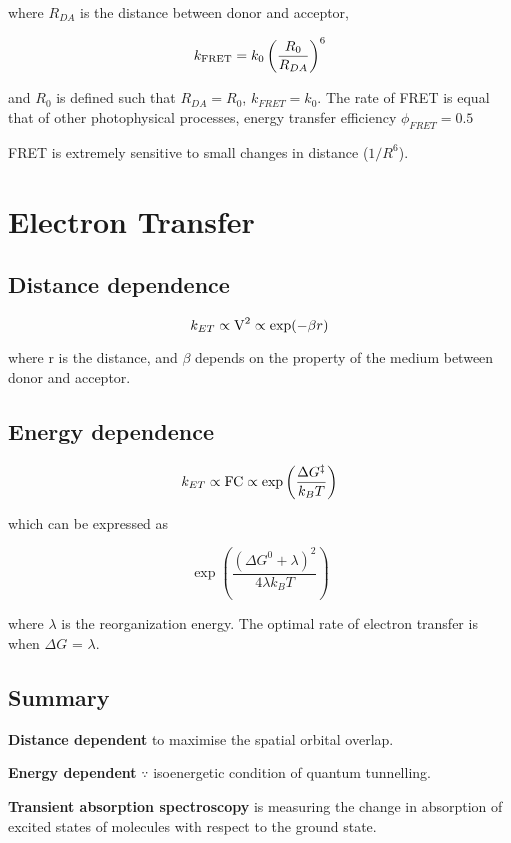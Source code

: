 where $R_{DA}$ is the distance between donor and acceptor, 

$$k_{\ce{FRET}} = k_0 \left( \frac{R_0}{R_{DA}} \right)^6$$

and $R_0$ is defined such that $R_{DA} = R_0$, $k_{FRET} = k_0.$ The rate of FRET is equal that of other photophysical processes, energy transfer efficiency $\phi_{FRET} = 0.5$
\vspace{\baselineskip}

FRET is extremely sensitive to small changes in distance ($1/R^6$).
\vspace{\baselineskip}

\section{Electron Transfer}

\subsection*{Distance dependence}
$$k_{ET} \propto \ce{V^2} \propto \exp(-\beta r)$$

where r is the distance, and $\beta$ depends on the property of the medium between donor and acceptor.

\subsection*{Energy dependence}
$$k_{ET} \propto \ce{FC} \propto \exp \left( \frac{\Delta G^{\ddag}}{k_B T} \right)$$

which can be expressed as

$$\exp \left( \frac{(\Delta G^{0} + \lambda)^2}{4 \lambda k_B T} \right)$$

where $\lambda$ is the reorganization energy. The optimal rate of electron transfer is when $\Delta G$ = $\lambda$.
\vspace{\baselineskip}

\subsection*{Summary}
\textbf{Distance dependent} to maximise the spatial orbital overlap.

\textbf{Energy dependent} $\because$ isoenergetic condition of quantum tunnelling.
\vspace{\baselineskip}

\textbf{Transient absorption spectroscopy} is measuring the change in absorption of excited states of molecules with respect to the ground state.
\vspace{\baselineskip}